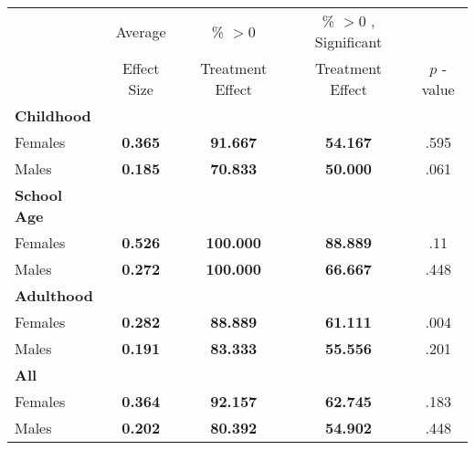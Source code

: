 \begin{tabular}{l c c c c}
\toprule
 & Average & \% $ >0 $ & \% $ >0 $ , Significant & \citet{Rosenbaum_2005_Distribution_JRSS} \\
 & Effect Size & Treatment Effect & Treatment Effect & $ p $ -value \\
\midrule
\textbf{Childhood} & & & & \\
\quad Females &  \textbf{    0.365} & \textbf{   91.667} & \textbf{   54.167} & .595 \\
\quad Males &  \textbf{    0.185} & \textbf{   70.833} & \textbf{   50.000} & .061 \\
\midrule
\textbf{School Age} & & & & \\
\quad Females &  \textbf{    0.526} & \textbf{  100.000} & \textbf{   88.889} & .11 \\
\quad Males &  \textbf{    0.272} & \textbf{  100.000} & \textbf{   66.667} & .448 \\
\midrule
\textbf{Adulthood} & & & & \\
\quad Females &  \textbf{    0.282} & \textbf{   88.889} & \textbf{   61.111} & .004 \\
\quad Males &  \textbf{    0.191} & \textbf{   83.333} & \textbf{   55.556} & .201 \\
\midrule
\textbf{All} & & & & \\
\quad Females &  \textbf{    0.364} & \textbf{   92.157} & \textbf{   62.745} & .183 \\
\quad Males &  \textbf{    0.202} & \textbf{   80.392} & \textbf{   54.902} & .448 \\
\bottomrule
\end{tabular}
